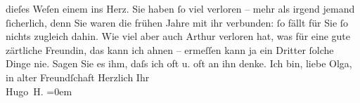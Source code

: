 \begin{ledgroupsized}[t]{13cm}
               dieſes Weſen einem ins Herz. Sie
               haben ſo viel {\pb}verloren – mehr als irgend jemand
               ſicherlich, denn Sie waren die frühen Jahre mit ihr verbunden: ſo fällt für Sie ſo
               nichts zugleich dahin.\pend
           \pstart
           Wie viel aber auch Arthur verloren hat, was für
               eine gute zärtliche Freundin, das kann ich ahnen – ermeſſen kann ja ein Dritter
               ſolche Dinge nie. Sagen Sie es ihm, daſs ich oft u. oft an ihn denke.\pend
           \pstart
           {\pb}Ich bin, liebe Olga, in alter Freundſchaft\pend
           \pstart
           Herzlich Ihr{\\[\baselineskip]}\spacefill\mbox{Hugo H.}\pend
           \leftskip=0em{}\endnumbering{}\end{ledgroupsized}  \newcommand{\dateiname}{L02340}\newcommand{\titel}{Hugo von Hofmannsthal an Olga Schnitzler, 17. 4. 1920}\newcommand{\editorInnen}{ Martin Anton Müller und Gerd-Hermann Susen}
      